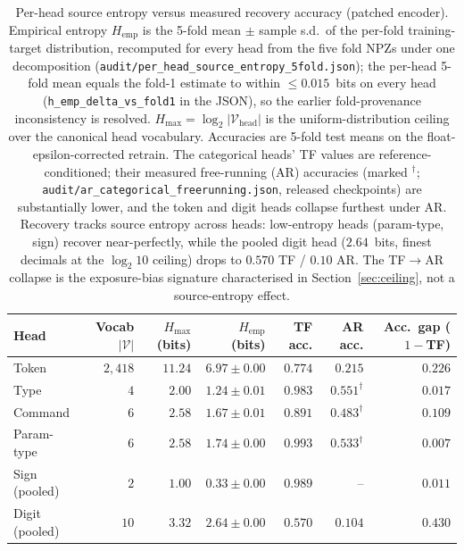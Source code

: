\begin{table}[ht]
\centering
\caption{Per-head source entropy versus measured recovery accuracy (patched encoder). Empirical entropy $H_{\text{emp}}$ is the 5-fold mean $\pm$ sample s.d.\ of the per-fold training-target distribution, recomputed for every head from the five fold NPZs under one decomposition (\texttt{audit/per\_head\_source\_entropy\_5fold.json}); the per-head 5-fold mean equals the fold-1 estimate to within $\le\!0.015$~bits on every head (\texttt{h\_emp\_delta\_vs\_fold1} in the JSON), so the earlier fold-provenance inconsistency is resolved. $H_{\max}=\log_2|\mathcal{V}_{\text{head}}|$ is the uniform-distribution ceiling over the canonical head vocabulary. Accuracies are 5-fold test means on the float-epsilon-corrected retrain. The categorical heads' TF values are reference-conditioned; their measured free-running (AR) accuracies (marked $^{\dagger}$; \texttt{audit/ar\_categorical\_freerunning.json}, released checkpoints) are substantially lower, and the token and digit heads collapse furthest under AR. Recovery tracks source entropy across heads: low-entropy heads (param-type, sign) recover near-perfectly, while the pooled digit head ($2.64$~bits, finest decimals at the $\log_2 10$ ceiling) drops to $0.570$ TF / $0.10$ AR. The TF$\to$AR collapse is the exposure-bias signature characterised in Section~\ref{sec:ceiling}, not a source-entropy effect.}
\label{tab:per_head_entropy}
\begin{tabular}{l r r r r r r}
\toprule
Head & Vocab $|\mathcal{V}|$ & $H_{\max}$ (bits) & $H_{\text{emp}}$ (bits) & TF acc. & AR acc. & Acc.\ gap ($1\!-\!$TF) \\
\midrule
Token          & $2{,}418$ & $11.24$ & $6.97 \pm 0.00$ & $0.774$ & $0.215$        & $0.226$ \\
Type           & $4$       & $2.00$  & $1.24 \pm 0.01$ & $0.983$ & $0.551^{\dagger}$ & $0.017$ \\
Command        & $6$       & $2.58$  & $1.67 \pm 0.01$ & $0.891$ & $0.483^{\dagger}$ & $0.109$ \\
Param-type     & $6$       & $2.58$  & $1.74 \pm 0.00$ & $0.993$ & $0.533^{\dagger}$ & $0.007$ \\
Sign (pooled)  & $2$       & $1.00$  & $0.33 \pm 0.00$ & $0.989$ & -- & $0.011$ \\
Digit (pooled) & $10$      & $3.32$  & $2.64 \pm 0.00$ & $0.570$ & $0.104$        & $0.430$ \\
\bottomrule
\end{tabular}
\par\smallskip

\end{table}
